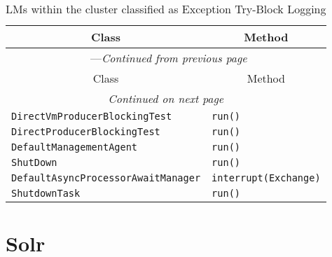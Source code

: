\begin{center}
\begin{longtable}{ll}
\caption{LMs within the cluster classified as Exception Try-Block Logging}\\
\toprule\multicolumn{1}{c}{Class}&\multicolumn{1}{c}{Method}\\\midrule
\endfirsthead

\multicolumn{2}{c}{\tablename\ \thetable{}---\textit{Continued from previous page}} \\\midrule
\multicolumn{1}{c}{Class}&\multicolumn{1}{c}{Method}\\\midrule
\endhead
\multicolumn{2}{c}{\textit{Continued on next page}}\\\midrule
\endfoot
\bottomrule
\endlastfoot

\lstinline/DirectVmProducerBlockingTest/&{\lstinline/run()/}\\
\lstinline/DirectProducerBlockingTest/&{\lstinline/run()/}\\
\lstinline/DefaultManagementAgent/&{\lstinline/run()/}\\
\lstinline/ShutDown/&{\lstinline/run()/}\\
\lstinline/DefaultAsyncProcessorAwaitManager/&{\lstinline/interrupt(Exchange)/}\\
\lstinline/ShutdownTask/&{\lstinline/run()/}\\
\end{longtable}
\end{center}

\section{Solr}\label{solr}

